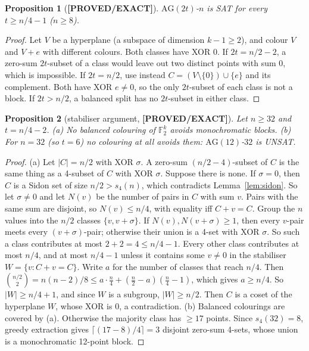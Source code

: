 \documentclass[11pt]{article}
\newtheorem{proposition}{Proposition}
\theoremstyle{definition}
\theoremstyle{remark}
\newcommand{\lab}[1]{\textbf{[#1]}}
\newcommand{\F}{\mathbb{F}}
\newcommand{\AG}{\mathrm{AG}}
\begin{document}
\begin{proposition}[\lab{PROVED/EXACT}]\label{prop:yes}
$\AG(2t)$-$n$ is SAT for every $t\ge n/4-1$ ($n\ge 8$).
\end{proposition}
\begin{proof}
Let $V$ be a hyperplane (a subspace of dimension $k-1\ge2$), and colour $V$ and $V+e$ with
different colours. Both classes have XOR $0$. If $2t=n/2-2$, a zero-sum $2t$-subset of a
class would leave out two distinct points with sum $0$, which is impossible. If $2t=n/2$,
use instead $C=(V\setminus\{0\})\cup\{e\}$ and its complement. Both have XOR $e\ne0$, so the
only $2t$-subset of each class is not a block. If $2t>n/2$, a balanced split has no
$2t$-subset in either class.
\end{proof}

\begin{proposition}[stabiliser argument, \lab{PROVED/EXACT}]\label{prop:stab}
Let $n\ge 32$ and $t=n/4-2$.
(a) No \emph{balanced} colouring of $\F_2^k$ avoids monochromatic blocks.
(b) For $n=32$ (so $t=6$) no colouring at all avoids them: $\AG(12)$-$32$ is UNSAT.
\end{proposition}
\begin{proof}
(a) Let $|C|=n/2$ with XOR $\sigma$. A zero-sum $(n/2-4)$-subset of $C$ is the same thing as
a 4-subset of $C$ with XOR $\sigma$. Suppose there is none. If $\sigma=0$, then $C$ is a
Sidon set of size $n/2>s_4(n)$, which contradicts Lemma~\ref{lem:sidon}. So let $\sigma\neq0$
and let $N(v)$ be the number of pairs in $C$ with sum $v$. Pairs with the same sum are
disjoint, so $N(v)\le n/4$, with equality iff $C+v=C$. Group the $n$ values into the $n/2$
classes $\{v,v+\sigma\}$. If $N(v),N(v+\sigma)\ge1$, then every $v$-pair meets every
$(v+\sigma)$-pair; otherwise their union is a 4-set with XOR $\sigma$. So such a class
contributes at most $2+2=4\le n/4-1$. Every other class contributes at most $n/4$, and at
most $n/4-1$ unless it contains some $v\neq0$ in the stabiliser $W=\{v:C+v=C\}$. Write $a$
for the number of classes that reach $n/4$. Then
$\binom{n/2}{2}=n(n-2)/8\le a\cdot\frac n4+(\frac n2-a)(\frac n4-1)$, which gives
$a\ge n/4$. So $|W|\ge n/4+1$, and since $W$ is a subgroup, $|W|\ge n/2$. Then $C$ is a coset
of the hyperplane $W$, whose XOR is $0$, a contradiction.
(b) Balanced colourings are covered by (a). Otherwise the majority class has $\ge17$ points.
Since $s_4(32)=8$, greedy extraction gives $\lceil(17-8)/4\rceil=3$ disjoint zero-sum 4-sets,
whose union is a monochromatic 12-point block.
\end{proof}
\end{document}
